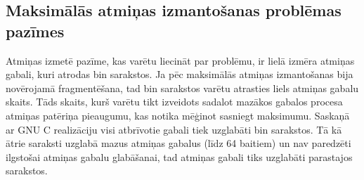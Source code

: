 \subsection{Maksimālās atmiņas izmantošanas problēmas pazīmes}



Atmiņas izmetē pazīme, kas varētu liecināt par problēmu, ir lielā izmēra atmiņas gabali, kuri atrodas bin sarakstos.
Ja pēc maksimālās atmiņas izmantošanas bija novērojamā fragmentēšana, tad bin sarakstos varētu atrasties liels atmiņas gabalu skaits.
Tāds skaits, kurš varētu tikt izveidots sadalot mazākos gabalos procesa atmiņas patēriņa pieaugumu, kas notika mēģinot sasniegt maksimumu.
Saskaņā ar GNU C realizāciju visi atbrīvotie gabali tiek uzglabāti bin sarakstos.
Tā kā ātrie saraksti uzglabā mazus atmiņas gabalus (līdz 64 baitiem) un nav paredzēti ilgstošai atmiņas gabalu glabāšanai, tad atmiņas gabali tiks uzglabāti parastajos sarakstos.

